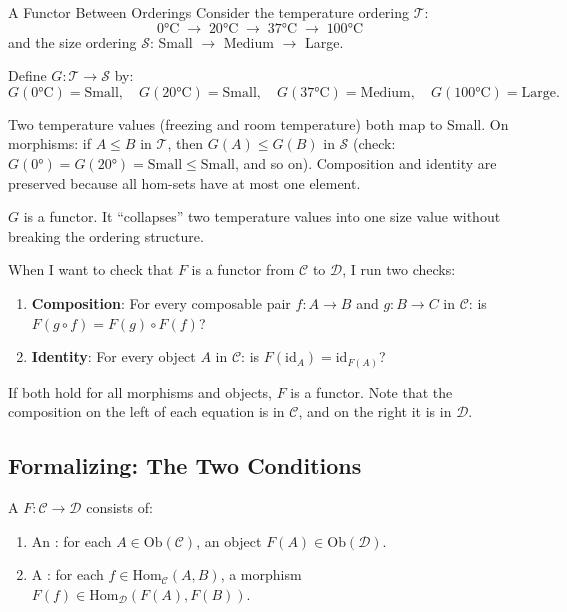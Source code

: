 \begin{example}{A Functor Between Orderings}
Consider the temperature ordering $\mathcal{T}$:
\[
  0°\text{C} \;\to\; 20°\text{C} \;\to\; 37°\text{C} \;\to\; 100°\text{C}
\]
and the size ordering $\mathcal{S}$: Small $\to$ Medium $\to$ Large.

Define $G : \mathcal{T} \to \mathcal{S}$ by:
\[
  G(0°\text{C}) = \mathrm{Small},\quad
  G(20°\text{C}) = \mathrm{Small},\quad
  G(37°\text{C}) = \mathrm{Medium},\quad
  G(100°\text{C}) = \mathrm{Large}.
\]

Two temperature values (freezing and room temperature) both map to Small.
On morphisms: if $A \leq B$ in $\mathcal{T}$, then $G(A) \leq G(B)$ in
$\mathcal{S}$ (check: $G(0°) = G(20°) = \mathrm{Small} \leq \mathrm{Small}$,
and so on). Composition and identity are preserved because all hom-sets have
at most one element.

$G$ is a functor. It ``collapses'' two temperature values into one size value
without breaking the ordering structure.
\end{example}

\begin{dialog}
When I want to check that $F$ is a functor from $\mathcal{C}$ to
$\mathcal{D}$, I run two checks:
\begin{enumerate}
  \item \textbf{Composition}: For every composable pair $f : A \to B$ and
        $g : B \to C$ in $\mathcal{C}$: is $F(g \circ f) = F(g) \circ F(f)$?
  \item \textbf{Identity}: For every object $A$ in $\mathcal{C}$: is
        $F(\mathrm{id}_A) = \mathrm{id}_{F(A)}$?
\end{enumerate}
If both hold for all morphisms and objects, $F$ is a functor. Note that the
composition on the left of each equation is in $\mathcal{C}$, and on the
right it is in $\mathcal{D}$.
\end{dialog}

\subsection{Formalizing: The Two Conditions}

A  $F : \mathcal{C} \to \mathcal{D}$ consists of:
\begin{enumerate}
  \item An : for each $A \in \mathrm{Ob}(\mathcal{C})$,
        an object $F(A) \in \mathrm{Ob}(\mathcal{D})$.
  \item A : for each $f \in \mathrm{Hom}_\mathcal{C}(A,B)$,
        a morphism $F(f) \in \mathrm{Hom}_\mathcal{D}(F(A), F(B))$.
\end{enumerate}

